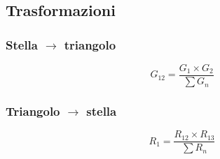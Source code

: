 \documentclass[10pt]{article}
\begin{document}
    \medskip

    \hspace{-.6cm} %
    \begin{minipage}[t]{.3\textwidth}

        \subsection*{Trasformazioni}
            \vspace{-.2cm}

            \subsubsection*{Stella \(\rightarrow\) triangolo}

                \[
                    G_{12} = \frac{G_1 \times G_2}{\sum G_n}
                \]

            \subsubsection*{Triangolo \(\rightarrow\) stella}

                \[
                    R_1 = \frac{R_{12} \times R_{13}}{\sum R_n}
                \]

    \end{minipage}
    \hfill
\end{document}
